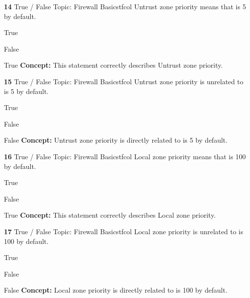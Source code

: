 \documentclass[10pt,a4paper]{article}
\begin{document}
\begin{qcard}{\color{white}\textbf{14} \hfill \small True / False \textbar{} Topic: Firewall Basics}{tfcol}
Untrust zone priority means that is 5 by default.

\begin{qoptions}
\item True
\item False
\end{qoptions}
\begin{explainbox}{True}
\textbf{Concept:} This statement correctly describes Untrust zone priority.
\end{explainbox}
\end{qcard}

\begin{qcard}{\color{white}\textbf{15} \hfill \small True / False \textbar{} Topic: Firewall Basics}{tfcol}
Untrust zone priority is unrelated to is 5 by default.

\begin{qoptions}
\item True
\item False
\end{qoptions}
\begin{explainbox}{False}
\textbf{Concept:} Untrust zone priority is directly related to is 5 by default.
\end{explainbox}
\end{qcard}

\begin{qcard}{\color{white}\textbf{16} \hfill \small True / False \textbar{} Topic: Firewall Basics}{tfcol}
Local zone priority means that is 100 by default.

\begin{qoptions}
\item True
\item False
\end{qoptions}
\begin{explainbox}{True}
\textbf{Concept:} This statement correctly describes Local zone priority.
\end{explainbox}
\end{qcard}

\begin{qcard}{\color{white}\textbf{17} \hfill \small True / False \textbar{} Topic: Firewall Basics}{tfcol}
Local zone priority is unrelated to is 100 by default.

\begin{qoptions}
\item True
\item False
\end{qoptions}
\begin{explainbox}{False}
\textbf{Concept:} Local zone priority is directly related to is 100 by default.
\end{explainbox}
\end{qcard}
\end{document}
